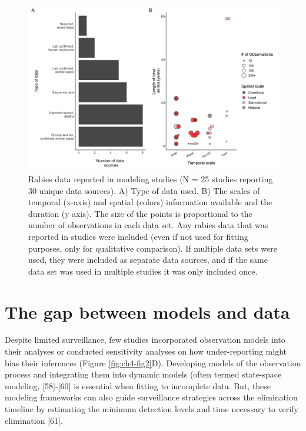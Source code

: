 \documentclass[
  oneside]{book}
\begin{document}
\begin{figure}
\includegraphics[width=0.9\linewidth]{figs/ch3/image3} \caption[Rabies data reported in modeling studies (N = 25 studies reporting 30 unique data sources).]{Rabies data reported in modeling studies (N = 25
studies reporting 30 unique data sources). A) Type of data used. B)
The scales of temporal (x-axis) and spatial (colors) information
available and the duration (y axis). The size of the points is
proportional to the number of observations in each data set. Any rabies
data that was reported in studies were included (even if not used for
fitting purposes, only for qualitative comparison). If multiple data
sets were used, they were included as separate data sources, and if the
same data set was used in multiple studies it was only included once.}\label{fig:ch4-fig3}
\end{figure}











\hypertarget{the-gap-between-models-and-data}{%
\section{The gap between models and data}\label{the-gap-between-models-and-data}}

Despite limited surveillance, few studies incorporated observation
models into their analyses or conducted sensitivity analyses on how
under-reporting might bias their inferences (Figure \ref{fig:ch4-fig2}D). Developing
models of the observation process and integrating them into dynamic
models (often termed state-space modeling, {[}58{]}-{[}60{]} is essential
when fitting to incomplete data. But, these modeling frameworks can also
guide surveillance strategies across the elimination timeline by
estimating the minimum detection levels and time necessary to verify
elimination {[}61{]}.
\end{document}
